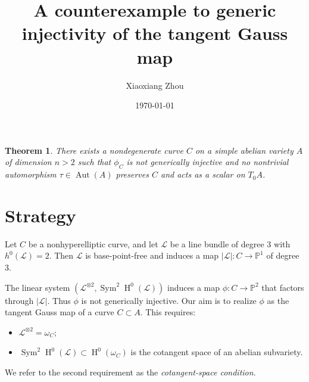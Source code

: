 \documentclass[UTF8]{amsart}
\numberwithin{equation}{section}
\theoremstyle{plain}
\newtheorem{theorem}{Theorem}[section]
\numberwithin{equation}{section}
\theoremstyle{remark}
\DeclareMathOperator{\Aut}{\operatorname{Aut}}
\DeclareMathOperator{\Sym}{\operatorname{Sym}}
\DeclareMathOperator{\Hnm}{\operatorname{H}}
\begin{document}
\date{\today}

\title
{A counterexample to generic injectivity of the tangent Gauss map
}
\author{Xiaoxiang Zhou}
\address{Institut für Mathematik\\
Humboldt-Universität zu Berlin\\
Berlin, 12489\\ Germany\\} 


\maketitle
\tableofcontents

\begin{theorem}
There exists a nondegenerate curve $C$ on a simple abelian variety $A$ of dimension $n>2$ such that $\phi_C$ is not generically injective and no nontrivial automorphism $\tau \in \Aut(A)$ preserves $C$ and acts as a scalar on $T_0A$.
\end{theorem}
\section{Strategy}

Let $C$ be a nonhyperelliptic curve, and let $\mathcal{L}$ be a line bundle of degree $3$ with $
h^0(\mathcal{L})=2$. Then $\mathcal{L}$ is base-point-free and induces a map $|\mathcal{L}|: C \longrightarrow \mathbb{P}^1$ of degree $3$.

The linear system $\left(\mathcal{L}^{\otimes 2}, \Sym^2 \Hnm^0(\mathcal{L})\right)$ induces a map $\phi:C \longrightarrow \mathbb{P}^2$ that factors through $|\mathcal{L}|$. Thus $\phi$ is not generically injective. Our aim is to realize $\phi$ as the tangent Gauss map of a curve $C \subset A$. This requires:

\begin{itemize}
\item $\mathcal{L}^{\otimes 2}= \omega_C$;
\item $\Sym^2 \Hnm^0(\mathcal{L}) \subset \Hnm^0(\omega_C)$ is the cotangent space of an abelian subvariety.
\end{itemize}
We refer to the second requirement as the \emph{cotangent-space condition}.
\end{document}
